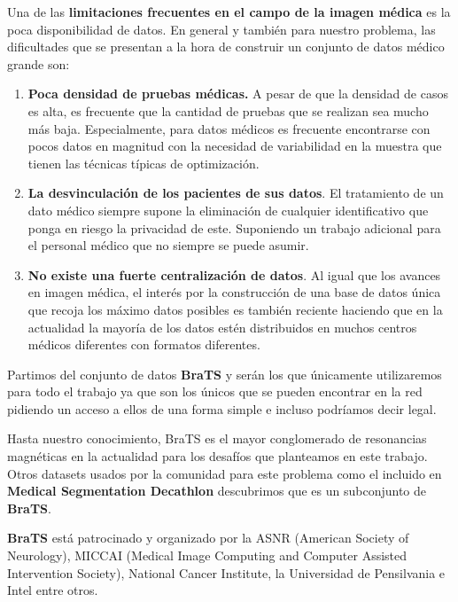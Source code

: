 Una de las \textbf{limitaciones frecuentes en el campo de la imagen médica} es la poca disponibilidad de datos. En general y también para nuestro problema, las dificultades que se presentan a la hora de construir un conjunto de datos médico grande son:

\begin{enumerate}
	\item \textbf{Poca densidad de pruebas médicas.} A pesar de que la densidad de casos es alta, es frecuente que la cantidad de pruebas que se realizan sea mucho más baja. Especialmente, para datos médicos es frecuente encontrarse con pocos datos en magnitud con la necesidad de variabilidad en la muestra que tienen las técnicas típicas de optimización.
	
	\item \textbf{La desvinculación de los pacientes de sus datos}. El tratamiento de un dato médico siempre supone la eliminación de cualquier identificativo que ponga en riesgo la privacidad de este. Suponiendo un trabajo adicional para el personal médico que no siempre se puede asumir.
	
	\item \textbf{No existe una fuerte centralización de datos}. Al igual que los avances en imagen médica, el interés por la construcción de una base de datos única que recoja los máximo datos posibles es también reciente haciendo que en la actualidad la mayoría de los datos estén distribuidos en muchos centros médicos diferentes con formatos diferentes.
	
\end{enumerate}

Partimos del conjunto de datos \textbf{BraTS} y serán los que únicamente utilizaremos para todo el trabajo ya que son los únicos que se pueden encontrar en la red pidiendo un acceso a ellos de una forma simple e incluso podríamos decir legal.

Hasta nuestro conocimiento, BraTS es el mayor conglomerado de resonancias magnéticas en la actualidad para los desafíos que planteamos en este trabajo. Otros datasets usados por la comunidad para este problema como el incluido en \textbf{Medical Segmentation Decathlon} descubrimos que es un subconjunto de \textbf{BraTS}.


\textbf{BraTS} está patrocinado y organizado por la ASNR (American Society of Neurology), MICCAI (Medical Image Computing and Computer Assisted Intervention Society), National Cancer Institute, la Universidad de Pensilvania e Intel entre otros. 

